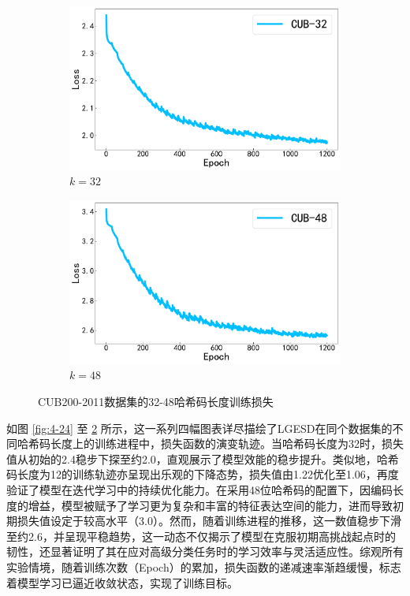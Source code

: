 \begin{figure}
  \begin{subfigure}{0.48\textwidth}
    \centering
    \includegraphics[width=\linewidth]{./Img/CUB-32.pdf}
    \caption{$k=32$}\label{fig:4-26}
  \end{subfigure}
  \hfil
  \begin{subfigure}{0.48\textwidth}
    \centering
    \includegraphics[width=\linewidth]{./Img/CUB-48.pdf}
    \caption{$k=48$}\label{fig:4-27}
  \end{subfigure}
  \caption{CUB200-2011数据集的32-48哈希码长度训练损失}
  \label{fig:4-28-b}
\end{figure}

如图 \ref{fig:4-24} 至 \ref{fig:4-27} 所示，这一系列四幅图表详尽描绘了LGESD在同个数据集的不同哈希码长度上的训练进程中，损失函数的演变轨迹。当哈希码长度为32时，损失值从初始的2.4稳步下探至约2.0，直观展示了模型效能的稳步提升。类似地，哈希码长度为12的训练轨迹亦呈现出乐观的下降态势，损失值由1.22优化至1.06，再度验证了模型在迭代学习中的持续优化能力。在采用48位哈希码的配置下，因编码长度的增益，模型被赋予了学习更为复杂和丰富的特征表达空间的能力，进而导致初期损失值设定于较高水平（3.0）。然而，随着训练进程的推移，这一数值稳步下滑至约2.6，并呈现平稳趋势，这一动态不仅揭示了模型在克服初期高挑战起点时的韧性，还显著证明了其在应对高级分类任务时的学习效率与灵活适应性。综观所有实验情境，随着训练次数（Epoch）的累加，损失函数的递减速率渐趋缓慢，标志着模型学习已逼近收敛状态，实现了训练目标。

